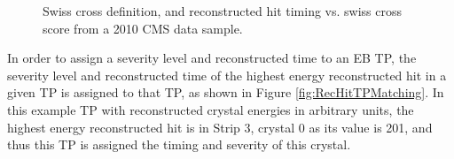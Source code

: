 \begin{figure}[H]%
    \setcounter{subfigure}{0}
    \centering
    \hfill
    \caption{Swiss cross definition, and reconstructed hit timing vs. swiss cross score from a 2010 CMS data sample.}%
\end{figure}

In order to assign a severity level and reconstructed time to an EB TP, the severity level and reconstructed time of the highest energy reconstructed hit in a given TP is assigned to that TP, as shown in Figure \ref{fig:RecHitTPMatching}. In this example TP with reconstructed crystal energies in arbitrary units, the highest energy reconstructed hit is in Strip 3, crystal 0 as its value is 201, and thus this TP is assigned the timing and severity of this crystal. 

